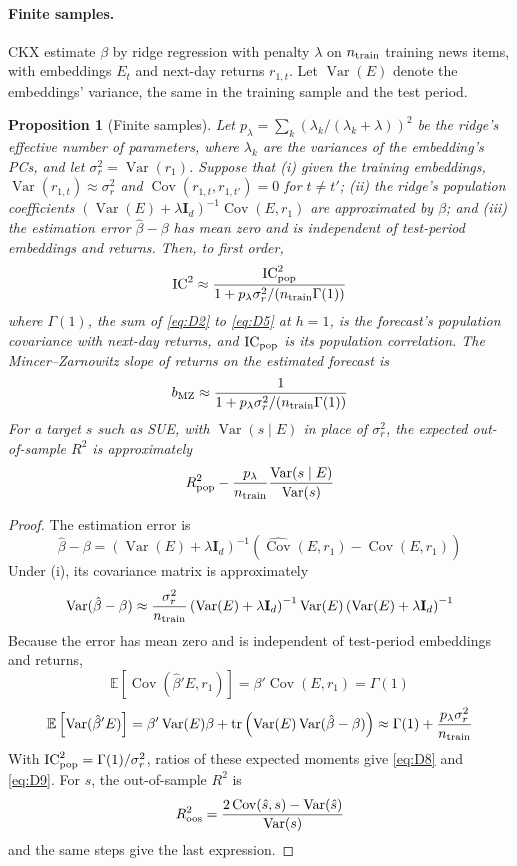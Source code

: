 \documentclass[11pt,letterpaper]{article}
\newtheorem{proposition}{Proposition}
\theoremstyle{remark}
\DeclareMathOperator{\Var}{Var}
\DeclareMathOperator{\Cov}{Cov}
\begin{document}
\paragraph{Finite samples.}
CKX estimate $\beta$ by ridge regression with penalty $\lambda$ on $n_{\rm train}$ training news items, with embeddings $E_t$ and next-day returns $r_{1,t}$. Let $\Var(E)$ denote the embeddings' variance, the same in the training sample and the test period.

\begin{proposition}[Finite samples]\label{prop:D1}
Let $p_\lambda=\sum_k\left(\lambda_k/(\lambda_k+\lambda)\right)^2$ be the ridge's effective number of parameters, where $\lambda_k$ are the variances of the embedding's PCs, and let $\sigma_r^2=\Var(r_1)$. Suppose that (i) given the training embeddings, $\Var(r_{1,t})\approx\sigma_r^2$ and $\Cov(r_{1,t},r_{1,t'})=0$ for $t\neq t'$; (ii) the ridge's population coefficients $\left(\Var(E)+\lambda\mathbf I_d\right)^{-1}\Cov(E,r_1)$ are approximated by $\beta$; and (iii) the estimation error $\hat\beta-\beta$ has mean zero and is independent of test-period embeddings and returns. Then, to first order,
\begin{equation}\label{eq:D8}
\mathrm{IC}^2\approx
\frac{\mathrm{IC}^2_{\rm pop}}
{1+p_\lambda\sigma_r^2/(n_{\rm train}\Gamma(1))}
\end{equation}
where $\Gamma(1)$, the sum of \eqref{eq:D2} to \eqref{eq:D5} at $h=1$, is the forecast's population covariance with next-day returns, and $\mathrm{IC}_{\rm pop}$ is its population correlation. The Mincer--Zarnowitz slope of returns on the estimated forecast is
\begin{equation}\label{eq:D9}
b_{\rm MZ}\approx
\frac{1}{1+p_\lambda\sigma_r^2/(n_{\rm train}\Gamma(1))}
\end{equation}
For a target $s$ such as SUE, with $\Var(s\mid E)$ in place of $\sigma_r^2$, the expected out-of-sample $R^2$ is approximately
\[
R^2_{\rm pop}
-\frac{p_\lambda}{n_{\rm train}}\frac{\Var(s\mid E)}{\Var(s)}
\]
\end{proposition}

\begin{proof}
The estimation error is
\[
\hat\beta-\beta
=\left(\Var(E)+\lambda\mathbf I_d\right)^{-1}
\left(\widehat{\Cov}(E,r_1)-\Cov(E,r_1)\right)
\]
Under (i), its covariance matrix is approximately
\[
\Var(\hat\beta-\beta)
\approx\frac{\sigma_r^2}{n_{\rm train}}
\left(\Var(E)+\lambda\mathbf I_d\right)^{-1}
\Var(E)
\left(\Var(E)+\lambda\mathbf I_d\right)^{-1}
\]
Because the error has mean zero and is independent of test-period embeddings and returns,
\[
\mathbb E\left[\Cov(\hat\beta'E,r_1)\right]
=\beta'\Cov(E,r_1)=\Gamma(1)
\]
\[
\mathbb E\left[\Var(\hat\beta'E)\right]
=\beta'\Var(E)\beta
+\operatorname{tr}\left(\Var(E)\Var(\hat\beta-\beta)\right)
\approx\Gamma(1)+\frac{p_\lambda\sigma_r^2}{n_{\rm train}}
\]
With $\mathrm{IC}^2_{\rm pop}=\Gamma(1)/\sigma_r^2$, ratios of these expected moments give \eqref{eq:D8} and \eqref{eq:D9}. For $s$, the out-of-sample $R^2$ is
\[
R^2_{\rm oos}
=\frac{2\Cov(\hat s,s)-\Var(\hat s)}{\Var(s)}
\]
and the same steps give the last expression.
\end{proof}
\end{document}
